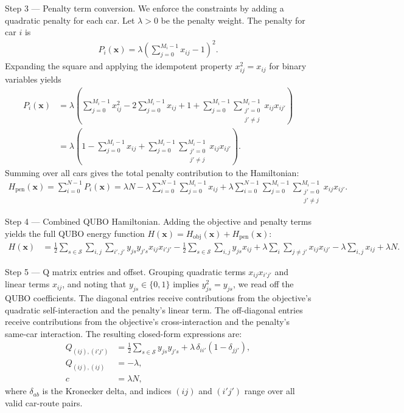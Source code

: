 \documentclass[12pt]{article}
\begin{document}
Step 3 --- Penalty term conversion. We enforce the constraints by adding a quadratic penalty for each car. Let $\lambda > 0$ be the penalty weight. The penalty for car $i$ is
\begin{align}
P_i(\mathbf{x}) = \lambda \left( \sum_{j=0}^{M_i-1} x_{ij} - 1 \right)^2.
\end{align}
Expanding the square and applying the idempotent property $x_{ij}^2 = x_{ij}$ for binary variables yields
\begin{align}
P_i(\mathbf{x}) &= \lambda \left( \sum_{j=0}^{M_i-1} x_{ij}^2 - 2 \sum_{j=0}^{M_i-1} x_{ij} + 1 + \sum_{j=0}^{M_i-1} \sum_{\substack{j'=0 \\ j' \neq j}}^{M_i-1} x_{ij} x_{ij'} \right) \\
&= \lambda \left( 1 - \sum_{j=0}^{M_i-1} x_{ij} + \sum_{j=0}^{M_i-1} \sum_{\substack{j'=0 \\ j' \neq j}}^{M_i-1} x_{ij} x_{ij'} \right).
\end{align}
Summing over all cars gives the total penalty contribution to the Hamiltonian:
\begin{align}
H_{\text{pen}}(\mathbf{x}) = \sum_{i=0}^{N-1} P_i(\mathbf{x}) = \lambda N - \lambda \sum_{i=0}^{N-1} \sum_{j=0}^{M_i-1} x_{ij} + \lambda \sum_{i=0}^{N-1} \sum_{j=0}^{M_i-1} \sum_{\substack{j'=0 \\ j' \neq j}}^{M_i-1} x_{ij} x_{ij'}.
\end{align}

Step 4 --- Combined QUBO Hamiltonian. Adding the objective and penalty terms yields the full QUBO energy function $H(\mathbf{x}) = H_{\text{obj}}(\mathbf{x}) + H_{\text{pen}}(\mathbf{x})$:
\begin{align}
H(\mathbf{x}) &= \frac{1}{2} \sum_{s \in \mathcal{S}} \sum_{i,j} \sum_{i',j'} y_{js} y_{j's} x_{ij} x_{i'j'} - \frac{1}{2} \sum_{s \in \mathcal{S}} \sum_{i,j} y_{js} x_{ij} + \lambda \sum_{i} \sum_{j \neq j'} x_{ij} x_{ij'} - \lambda \sum_{i,j} x_{ij} + \lambda N.
\end{align}

Step 5 --- Q matrix entries and offset. Grouping quadratic terms $x_{ij} x_{i'j'}$ and linear terms $x_{ij}$, and noting that $y_{js} \in \{0,1\}$ implies $y_{js}^2 = y_{js}$, we read off the QUBO coefficients. The diagonal entries receive contributions from the objective's quadratic self-interaction and the penalty's linear term. The off-diagonal entries receive contributions from the objective's cross-interaction and the penalty's same-car interaction. The resulting closed-form expressions are:
\begin{align}
Q_{(ij),(i'j')} &= \frac{1}{2} \sum_{s \in \mathcal{S}} y_{js} y_{j's} + \lambda \, \delta_{ii'} (1 - \delta_{jj'}), \\
Q_{(ij),(ij)} &= -\lambda, \\
c &= \lambda N,
\end{align}
where $\delta_{ab}$ is the Kronecker delta, and indices $(ij)$ and $(i'j')$ range over all valid car-route pairs.
\end{document}
